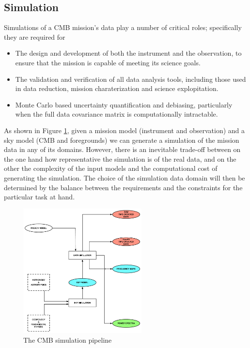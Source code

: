 \newpage

\subsection{Simulation}

Simulations of a CMB mission's data play a number of critical roles; specifically they are required for
\begin{itemize}
\item The design and development of both the instrument and the observation, to ensure that the mission is capable of meeting its science goals.
\item The validation and verification of all data analysis tools, including those used in data reduction, mission charaterization and science explopitation.
\item Monte Carlo based uncertainty quantification and debiasing, particularly when the full data covariance matrix is computationally intractable.
\end{itemize}

As shown in Figure \ref{fig_sim}, given a mission model (instrument and observation) and a sky model (CMB and foregrounds) we can generate a simulation of the mission data in any of its domains. However, there is an inevitable trade-off between on the one hand how representative the simulation is of the real data, and on the other the complexity of the input models and the computational cost of generating the simulation. The choice of the simulation data domain will then be determined by the balance between the requirements and the constraints for the particular task at hand.

\begin{figure}[htbp]
\includegraphics[width=0.575\textwidth]{Analysis/sim}
\caption{The CMB simulation pipeline}
\label{fig_sim}
\end{figure}

